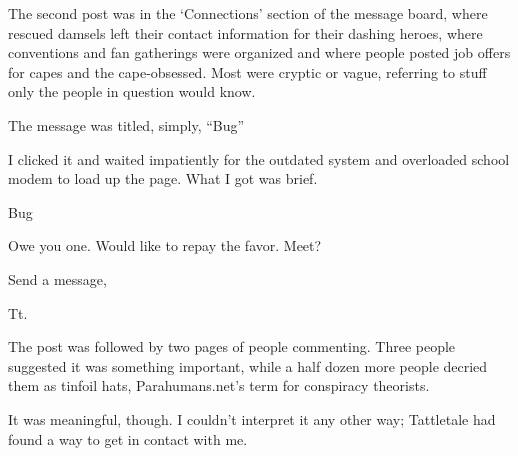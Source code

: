 The second post was in the `Connections' section of the message board, where rescued damsels left their contact information for their dashing heroes, where conventions and fan gatherings were organized and where people posted job offers for capes and the cape-obsessed.  Most were cryptic or vague, referring to stuff only the people in question would know.



The message was titled, simply, ``Bug''



I clicked it and waited impatiently for the outdated system and overloaded school modem to load up the page.  What I got was brief.



Bug



Owe you one.  Would like to repay the favor.  Meet?



Send a message,



Tt.



The post was followed by two pages of people commenting.  Three people suggested it was something important, while a half dozen more people decried them as tinfoil hats, Parahumans.net's term for conspiracy theorists.



It was meaningful, though.  I couldn't interpret it any other way; Tattletale had found a way to get in contact with me.





